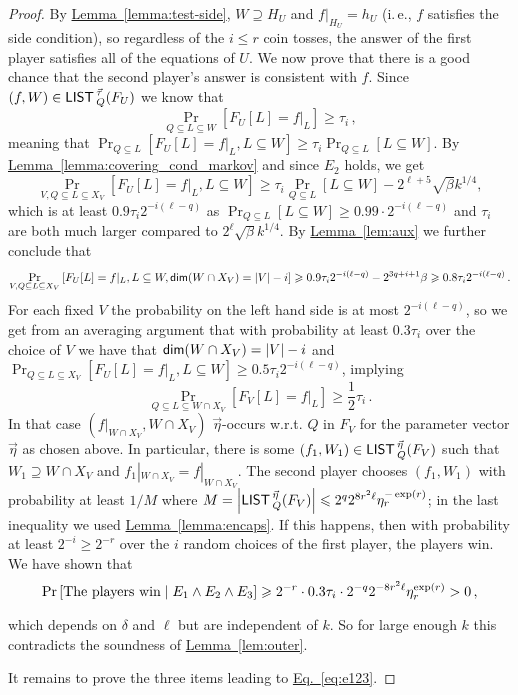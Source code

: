 \documentclass[11pt]{article}
\numberwithin{equation}{section}
\theoremstyle{definition}
\theoremstyle{plain}
\newcommand{\ie}{i.\,e.}
\newcommand{\expref}[2]{\hyperref[#2]{#1~\ref{#2}}}
\newcommand{\expeqref}[2]{\hyperref[#2]{#1~\eqref{#2}}}
\newcommand\card[1]{\left| {#1} \right|}
\newcommand\Prob[2]{{\Pr_{#1}\left[ {#2} \right]}}
\renewcommand\geq{\geqslant}
\renewcommand\ge{\geqslant}
\renewcommand\le{\leqslant}
\renewcommand\subset{\subseteq}
\renewcommand\supset{\supseteq}
\def\M{{\sf LIST\,}}
\begin{document}
\begin{proof}
By \expref{Lemma}{lemma:test-side}, $W\supset H_U$ and
$f|_{H_U}=h_U$ (\ie, $f$ satisfies the side condition), so regardless
of the $i\le r$ coin tosses, the answer of the first player satisfies
all of the equations of $U$. We now prove that there is a good chance
that the second player's answer is consistent with $f$. Since
$(f,W)\in\M^{\vec\tau}_Q(F_U)$ we know that
\[ \Prob{Q \subset L \subset W} { F_U[L] = f|_L } \ge \tau_i\, ,
\]
%
meaning that
$\Prob{Q\subseteq L}{F_U[L]=f|_{L}, L\subseteq W}\geq \tau_i \Prob{Q\subseteq L}{L\subseteq W}$.
By \expref{Lemma}{lemma:covering_cond_markov} and
since $E_2$ holds, we get
\[
\Prob{V, Q\subseteq L\subseteq X_V}{F_U[L]=f|_{L}, L\subseteq W}\geq
\tau_i \Prob{Q\subseteq L}{L\subseteq W}-2^{\ell+5}\sqrt{\beta}k^{1/4},
\]
which is at least $0.9\tau_i 2^{-i(\ell-q)}$ as
$\Prob{Q\subseteq L}{L\subseteq W} \geq 0.99\cdot 2^{-i(\ell-q)}$ and $\tau_i$ are both much
larger compared to $2^{\ell}\sqrt{\beta}k^{1/4}$. By \expref{Lemma}{lem:aux} we further conclude that
\[
\Prob{V, Q\subseteq L\subseteq X_V}{F_U[L]=f|_{L}, L\subseteq W, {\sf dim}(W\cap X_V)=|V| - i}\geq
0.9\tau_i 2^{-i(\ell-q)} - 2^{3q+i+1}\beta
\geq
0.8\tau_i 2^{-i(\ell-q)}\,.
\]
For each fixed $V$ the probability on the left hand side is at most $2^{-i(\ell-q)}$, so we get from an averaging argument
that with probability at least $0.3\tau_i$ over the choice of $V$ we have that ${\sf dim}(W\cap X_V)=|V|-i$ and
$\Prob{Q\subseteq L\subseteq X_V}{F_U[L]=f|_{L}, L\subseteq W}\geq 0.5\tau_i 2^{-i(\ell-q)}$, implying
\[
%
\Prob{Q \subset L \subset W\cap X_V} { F_V[L] = f|_L }\geq \frac{1}{2}\tau_i\,.
\]
%
In that case $(f|_{W\cap X_V},W\cap X_V)$ $\vec\eta$-occurs w.r.t. $Q$ in $F_V$ for the parameter vector $\vec\eta$ as chosen above. In particular, there is some $(f_1,W_1)\in\M^{\vec\eta}_Q(F_V)$ such that $W_1\supseteq W\cap X_V$ and $f_1|_{W\cap X_V}=f|_{W\cap X_V}$. The second player chooses $(f_1,W_1)$ with probability at least $1/M$ where $M = \card{\M_Q^{\vec\eta}(F_V)}\le 2^q 2^{8r^2\ell}\eta_r^{-\exp(r)}$;
 in the last inequality we used \expref{Lemma}{lemma:encaps}. %
If this happens, then with probability at least $2^{-i}\ge 2^{-r}$ over the $i$ random choices of the first player, the players win. We have shown that
\[ \Prob{}{\hbox{The players win} \mid E_1\wedge E_2\wedge E_3} \ge 2^{-r} \cdot 0.3\tau_i\cdot 2^{-q}2^{-8r^2\ell}\eta_r^{\exp(r)}>0\,,
\]
which depends on $\delta$ and $\ell$ but are independent of $k$. So for large enough $k$ this contradicts the soundness of \expref{Lemma}{lem:outer}.

It remains to prove the three items leading to \expeqref{Eq.}{eq:e123}.

\end{proof}
\end{document}
